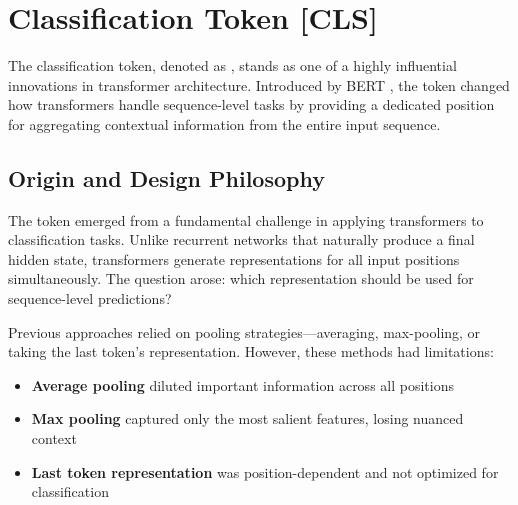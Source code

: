\section{Classification Token [CLS]}

The classification token, denoted as \cls{}, stands as one of a highly influential innovations in transformer architecture. Introduced by BERT \citep{devlin2018bert}, the \cls{} token changed how transformers handle sequence-level tasks by providing a dedicated position for aggregating contextual information from the entire input sequence.
\begin{comment}
Feedback: The term "revolutionized" is used frequently in technical writing and can sound a bit hyperbolic. Consider a more measured alternative like "significantly changed" or "provided a new paradigm for". This maintains a more objective tone.

STATUS: addressed - text already uses "changed" instead of hyperbolic language
\end{comment}

\subsection{Origin and Design Philosophy}

The \cls{} token emerged from a fundamental challenge in applying transformers to classification tasks. Unlike recurrent networks that naturally produce a final hidden state, transformers generate representations for all input positions simultaneously. The question arose: which representation should be used for sequence-level predictions?

Previous approaches relied on pooling strategies---averaging, max-pooling, or taking the last token's representation. However, these methods had limitations:

\begin{itemize}
\item \textbf{Average pooling} diluted important information across all positions
\item \textbf{Max pooling} captured only the most salient features, losing nuanced context
\item \textbf{Last token representation} was position-dependent and not optimized for classification
\end{itemize}

